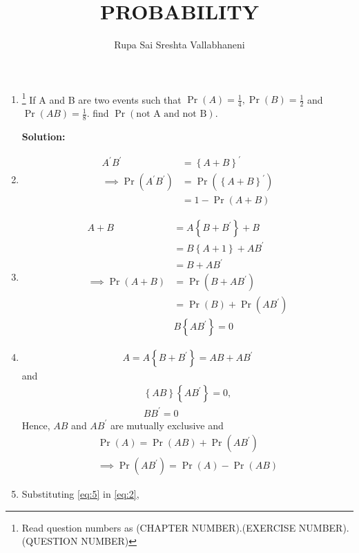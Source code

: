 \documentclass{article}
\providecommand{\brak}[1]{\ensuremath{\left\{#1\right\}}}
\newcommand{\solution}{\noindent \textbf{Solution: }}
\providecommand{\pr}[1]{\ensuremath{\Pr\left(#1\right)}}
\begin{document}
\title{PROBABILITY}
\author{\Large Rupa Sai Sreshta Vallabhaneni}
\date{}

\maketitle
\begin{enumerate}[label=13.\arabic{enumi}.\arabic{enumii}]%
\setcounter{enumi}{1}
\setcounter{enumii}{9}

\item \footnote{Read question numbers as (CHAPTER NUMBER).(EXERCISE NUMBER).(QUESTION NUMBER)} If A and B are two events such that $\pr{A} = \frac{1}{4}, \pr{B} = \frac{1}{2}$ and $\pr{A B} = \frac{1}{8}$. find $\pr{\text{not A and not B}}$.

\solution
\item 
\begin{align}
A^{\prime}B^{\prime} &=  \brak{A+B}^{\prime}
\\
\implies \pr{A^{\prime}B^{\prime}} &=  \pr{\brak{A+B}^{\prime}} 
\\
&= 1 - \pr{A+B} 
\label{eq:1}
\end{align} 
\item 
\begin{align}
 A+B &= A\brak{B+B^{\prime}} + B
\\
&= B \brak{A +1} + A B^{\prime}
\\
&=B + A B^{\prime}
\\
\implies \pr{A+B} &= \pr{B + A B^{\prime} }
\\
&=\pr{B}+\pr{ A B^{\prime} } 
\\
&B \brak{ A B^{\prime} } = 0
\label{eq:2}
\end{align}
\item 
\begin{align}
A = A \brak{B+B^{\prime}} =  AB + AB^{\prime}
\label{eq:3}
\end{align}
and 
\begin{align}
\brak{ AB}\brak{  AB^{\prime}} = 0, 
\\
 BB^{\prime} = 0
\label{eq:4}
\end{align}
Hence, $AB$ and $AB^{\prime}$ are mutually exclusive and 
%
\begin{align}
\pr{A} = \pr{AB} + \pr{AB^{\prime}}
\\
\implies 
\pr{AB^{\prime}} =  \pr{A} - \pr{AB}
\label{eq:5}
\end{align}
\item Substituting \eqref{eq:5} in \eqref{eq:2}, 

\end{enumerate}
\end{document}
